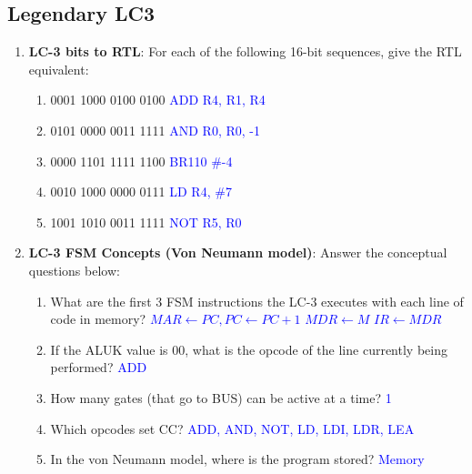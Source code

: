 \documentclass{article}
\begin{document}
\begin{enumerate}[label=(\alph*)]
\newpage
\section{Legendary LC3}
    \begin{enumerate}[label=(\alph*)]
        \item \textbf{LC-3 bits to RTL}: For each of the following 16-bit sequences, give the RTL equivalent:
        \begin{enumerate}[label=(\roman*),itemsep = 10pt]
            \item 0001 1000 0100 0100 \textcolor{blue}{ADD R4, R1, R4}
            \item 0101 0000 0011 1111 \textcolor{blue}{AND R0, R0, -1}
            \item 0000 1101 1111 1100 \textcolor{blue}{BR{110} \#-4}
            \item 0010 1000 0000 0111 \textcolor{blue}{LD R4, \#7}
            \item 1001 1010 0011 1111 \textcolor{blue}{NOT R5, R0}
        \end{enumerate}
        \item \textbf{LC-3 FSM Concepts (Von Neumann model)}: Answer the conceptual questions below:
        \begin{enumerate}[label=(\roman*),itemsep = 10pt]
            \item What are the first 3 FSM instructions the LC-3 executes with each line of code in memory?
            \newline \textcolor{blue}{$MAR \leftarrow PC, PC\leftarrow PC+1$ \newline $MDR \leftarrow M$ \newline $IR \leftarrow MDR$}
            \item If the ALUK value is 00, what is the opcode of the line currently being performed?
            \newline \textcolor{blue}{ADD}
            \item How many gates (that go to BUS) can be active at a time?
            \newline \textcolor{blue}{1}
            \item Which opcodes set CC?
            \newline \textcolor{blue}{ADD, AND, NOT, LD, LDI, LDR, LEA}
            \item In the von Neumann model, where is the program stored?
            \newline \textcolor{blue}{Memory}
            

\end{enumerate}
\end{enumerate}
\end{enumerate}
\end{document}
